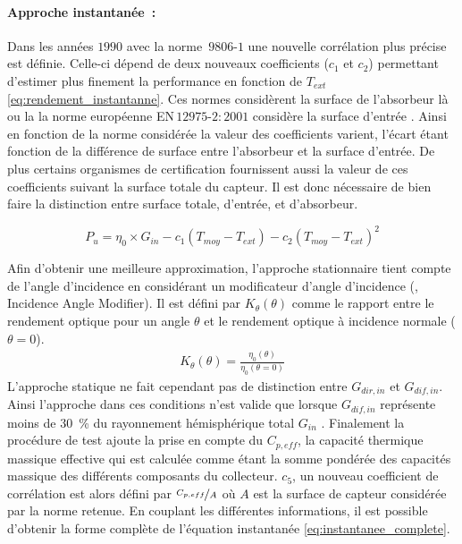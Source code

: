 \paragraph{Approche instantanée~:} %
\label{par:approche_instantanée}
Dans les années $1990$ avec la norme \,$9806$-$1$ une nouvelle corrélation plus précise est définie. Celle-ci
dépend de deux nouveaux coefficients ($c_{1}$ et $c_{2}$) permettant d’estimer plus
finement la performance en fonction de $T_{ext}$ \eqref{eq:rendement_instantanne}.
Ces normes considèrent la surface de l’absorbeur là ou la la norme européenne
EN\,$12975$-$2:2001$ considère la surface d’entrée \parencite{EN1297522001}.
Ainsi en fonction de la norme considérée la valeur des coefficients varient, l’écart étant
fonction de la différence de surface entre l’absorbeur et la surface d’entrée.
De plus certains organismes de certification fournissent aussi la valeur de ces coefficients suivant la
surface totale du capteur. Il est donc nécessaire de bien faire la distinction entre
surface totale, d’entrée, et d’absorbeur.

\begin{equation}\label{eq:rendement_instantanne}
    P_{u} = \eta_{0} \times G_{in}- c_{1} (T_{moy} - T_{ext}) - c_{2} (T_{moy} - T_{ext})^{2}
\end{equation}

Afin d’obtenir une meilleure approximation, l’approche stationnaire tient compte
de l’angle d’incidence en considérant un modificateur d’angle d’incidence (, Incidence Angle Modifier).
Il est défini par $K_{\theta}(\theta)$ comme le rapport entre le rendement optique pour un angle $\theta$
et le rendement optique à incidence normale ($\theta = 0$).
\begin{equation}\label{eq:IAM}
    \begin{aligned}
    K_{\theta}(\theta) = \frac{\eta_{0}(\theta)}{\eta_{0}(\theta = 0)}
    \end{aligned}
\end{equation}
L’approche statique ne fait cependant pas de distinction entre $G_{dir, in}$ et $G_{dif,
in}$. Ainsi l’approche dans ces conditions n’est valide que lorsque $G_{dif, in}$
représente moins de \SI{30}{\percent} du rayonnement hémisphérique total $G_{in}$ \parencite{Osorio2014}.
Finalement la procédure de test ajoute la prise en compte du $C_{p, eff}$, la capacité
thermique massique effective qui est calculée comme étant la somme pondérée des capacités
massique des différents composants du collecteur. $c_{5}$, un nouveau coefficient de
corrélation est alors défini par $\nicefrac{C_{p, eff}}{A}$ où $A$ est la surface de
capteur considérée par la norme retenue. En couplant les différentes informations, il est
possible d’obtenir la forme complète de l’équation instantanée
\eqref{eq:instantanee_complete}.

